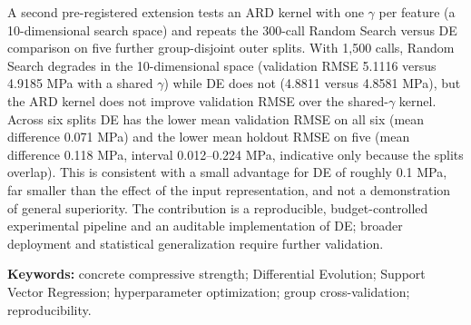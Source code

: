 A second pre-registered extension tests an ARD kernel with one $\gamma$ per feature (a 10-dimensional search space) and repeats the 300-call Random Search versus DE comparison on five further group-disjoint outer splits. With 1{,}500 calls, Random Search degrades in the 10-dimensional space (validation RMSE 5.1116 versus 4.9185 MPa with a shared $\gamma$) while DE does not (4.8811 versus 4.8581 MPa), but the ARD kernel does not improve validation RMSE over the shared-$\gamma$ kernel. Across six splits DE has the lower mean validation RMSE on all six (mean difference 0.071 MPa) and the lower mean holdout RMSE on five (mean difference 0.118 MPa, interval 0.012--0.224 MPa, indicative only because the splits overlap). This is consistent with a small advantage for DE of roughly 0.1 MPa, far smaller than the effect of the input representation, and not a demonstration of general superiority. The contribution is a reproducible, budget-controlled experimental pipeline and an auditable implementation of DE; broader deployment and statistical generalization require further validation.

\medskip\noindent\textbf{Keywords:} concrete compressive strength; Differential Evolution; Support Vector Regression; hyperparameter optimization; group cross-validation; reproducibility.

